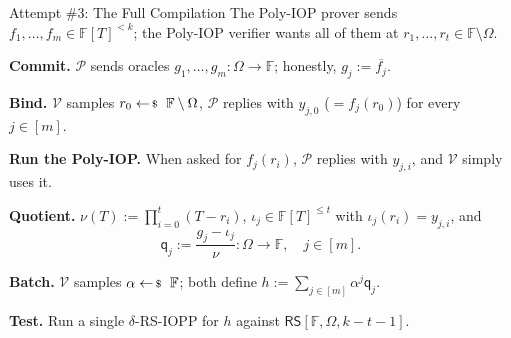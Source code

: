 \documentclass{zkdl-presentation-template}
\begin{document}
    \begin{frame}{Attempt \#3: The Full Compilation}
        The Poly-IOP prover sends $f_1, \dots, f_m \in \mathbb{F}[T]^{<k}$; the Poly-IOP verifier wants all of them at $r_1, \dots, r_t \in \mathbb{F} \setminus \Omega$.
        \begin{algoen}
            \item<2-> \textbf{Commit.} $\mathcal{P}$ sends oracles $g_1, \dots, g_m: \Omega \to \mathbb{F}$; honestly, $g_j := \overline{f_j}$.
            \item<3-> \textbf{Bind.} $\mathcal{V}$ samples $r_0 \leftarrowS \mathbb{F} \setminus \Omega$, $\mathcal{P}$ replies with $y_{j,0}$ ($= f_j(r_0)$) for every $j \in [m]$.
            \item<4-> \textbf{Run the Poly-IOP.} When asked for $f_j(r_i)$, $\mathcal{P}$ replies with $y_{j,i}$, and $\mathcal{V}$ simply uses it.
            \item<5-> \textbf{Quotient.} $\nu(T) := \prod_{i=0}^{t} (T - r_i)$, $\iota_j \in \mathbb{F}[T]^{\leq t}$ with $\iota_j(r_i) = y_{j,i}$, and
            \begin{equation*}
                \mathsf{q}_j := \frac{g_j - \iota_j}{\nu}: \Omega \to \mathbb{F}, \quad j \in [m].
            \end{equation*}
            \vspace{-10pt}
            \item<6-> \textbf{Batch.} $\mathcal{V}$ samples $\alpha \leftarrowS \mathbb{F}$; both define $h := \sum_{j \in [m]} \alpha^{j} \mathsf{q}_j$.
            \item<7-> \textbf{Test.} Run a single $\delta$-RS-IOPP for $h$ against $\mathsf{RS}[\mathbb{F}, \Omega, k - t - 1]$.
        \end{algoen}
    \end{frame}
\end{document}
